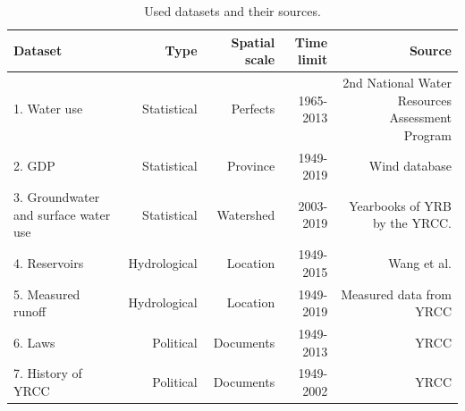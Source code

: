 \documentclass[9pt,twoside,lineno]{pnas-new}
\begin{document}
\begin{table}\centering
    \caption{Used datasets and their sources.}
    
    \begin{tabular}{lrrrr}
    Dataset & Type & Spatial scale & Time limit & Source \\
    \midrule
    1. Water use & Statistical & Perfects & 1965-2013 & 2nd National Water Resources Assessment Program \\
    2. GDP & Statistical & Province & 1949-2019 & Wind database \\
    3. Groundwater and surface water use & Statistical & Watershed & 2003-2019 & Yearbooks of YRB by the YRCC. \\
    4. Reservoirs & Hydrological & Location & 1949-2015 & Wang et al. \cite{wangYellowRiverWater2019} \\
    5. Measured runoff & Hydrological & Location & 1949-2019 & Measured data from YRCC \\
    6. Laws & Political & Documents & 1949-2013 & YRCC \cite{yellowriverconservancycommissionYellowRiverBasin2013} \\
    7. History of YRCC & Political & Documents & 1949-2002 & YRCC \cite{ yellowriverarchivesOrganizationalHistoryYellow2004} \\
    \bottomrule
    \end{tabular}
\end{table}

\end{document}
